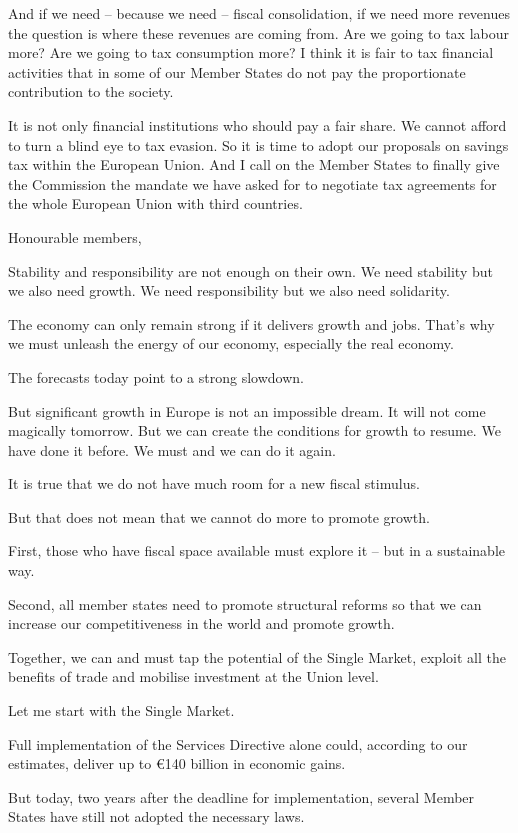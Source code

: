 \documentclass[a4paper,11pt]{article}
\begin{document}
And if we need – because we need – fiscal consolidation, if we need more revenues the question is where these revenues are coming from. Are we going to tax labour more? Are we going to tax consumption more? I think it is fair to tax financial activities that in some of our Member States do not pay the proportionate contribution to the society.

It is not only financial institutions who should pay a fair share. We cannot afford to turn a blind eye to tax evasion. So it is time to adopt our proposals on savings tax within the European Union. And I call on the Member States to finally give the Commission the mandate we have asked for to negotiate tax agreements for the whole European Union with third countries.

Honourable members,

Stability and responsibility are not enough on their own. We need stability but we also need growth. We need responsibility but we also need solidarity.

The economy can only remain strong if it delivers growth and jobs. That's why we must unleash the energy of our economy, especially the real economy.

The forecasts today point to a strong slowdown.

But significant growth in Europe is not an impossible dream. It will not come magically tomorrow. But we can create the conditions for growth to resume. We have done it before. We must and we can do it again.

It is true that we do not have much room for a new fiscal stimulus.

But that does not mean that we cannot do more to promote growth.

First, those who have fiscal space available must explore it – but in a sustainable way.

Second, all member states need to promote structural reforms so that we can increase our competitiveness in the world and promote growth.

Together, we can and must tap the potential of the Single Market, exploit all the benefits of trade and mobilise investment at the Union level.

Let me start with the Single Market.

Full implementation of the Services Directive alone could, according to our estimates, deliver up to \euro 140 billion in economic gains.

But today, two years after the deadline for implementation, several Member States have still not adopted the necessary laws.
\end{document}
